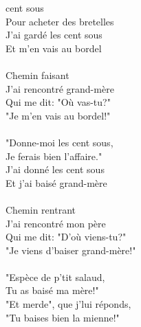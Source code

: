 
 cent sous \bissimple
\\Pour acheter des bretelles \bissimple
\\J'ai gardé les cent sous \bissimple
\\Et m'en vais au bordel \bissimple
\\\\Chemin faisant \bissimple
\\J'ai rencontré grand-mère \bissimple
\\Qui me dit: "Où vas-tu?" \bissimple
\\"Je m'en vais au bordel!" \bissimple
\\\\"Donne-moi les cent sous, \bissimple
\\Je ferais bien l'affaire." \bissimple
\\J'ai donné les cent sous \bissimple
\\Et j'ai baisé grand-mère \bissimple
\\\\Chemin rentrant \bissimple
\\J'ai rencontré mon père \bissimple
\\Qui me dit: "D'où viens-tu?" \bissimple
\\"Je viens d'baiser grand-mère!" \bissimple
\\\\"Espèce de p'tit salaud, \bissimple
\\Tu as baisé ma mère!" \bissimple
\\"Et merde", que j'lui réponds, \bissimple
\\"Tu baises bien la mienne!" \bissimple

\breakpage
